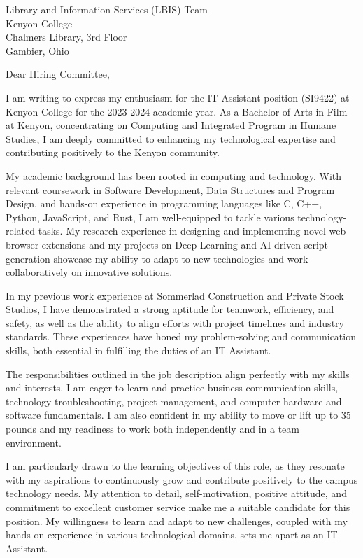 \documentclass[a4paper,10pt]{letter}
\begin{document}
\begin{letter}{Library and Information Services (LBIS) Team \\
Kenyon College \\
Chalmers Library, 3rd Floor \\
Gambier, Ohio}

\opening{Dear Hiring Committee,}

I am writing to express my enthusiasm for the IT Assistant position (SI9422) at Kenyon College for the 2023-2024 academic year. As a Bachelor of Arts in Film at Kenyon, concentrating on Computing and Integrated Program in Humane Studies, I am deeply committed to enhancing my technological expertise and contributing positively to the Kenyon community. 

My academic background has been rooted in computing and technology. With relevant coursework in Software Development, Data Structures and Program Design, and hands-on experience in programming languages like C, C++, Python, JavaScript, and Rust, I am well-equipped to tackle various technology-related tasks. My research experience in designing and implementing novel web browser extensions and my projects on Deep Learning and AI-driven script generation showcase my ability to adapt to new technologies and work collaboratively on innovative solutions.

In my previous work experience at Sommerlad Construction and Private Stock Studios, I have demonstrated a strong aptitude for teamwork, efficiency, and safety, as well as the ability to align efforts with project timelines and industry standards. These experiences have honed my problem-solving and communication skills, both essential in fulfilling the duties of an IT Assistant.

The responsibilities outlined in the job description align perfectly with my skills and interests. I am eager to learn and practice business communication skills, technology troubleshooting, project management, and computer hardware and software fundamentals. I am also confident in my ability to move or lift up to 35 pounds and my readiness to work both independently and in a team environment.

I am particularly drawn to the learning objectives of this role, as they resonate with my aspirations to continuously grow and contribute positively to the campus technology needs. My attention to detail, self-motivation, positive attitude, and commitment to excellent customer service make me a suitable candidate for this position. My willingness to learn and adapt to new challenges, coupled with my hands-on experience in various technological domains, sets me apart as an IT Assistant.


\end{letter}
\end{document}
